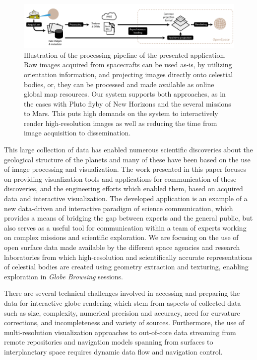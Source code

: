 \documentclass[journal]{vgtc}                %
\begin{document}
\begin{figure}
\includegraphics[width=\linewidth]{figures/overview.pdf}
\caption{Illustration of the processing pipeline of the presented application. Raw images acquired from spacecrafts can be used as-is, by utilizing orientation information, and projecting images directly onto celestial bodies, or, they can be processed and made available as online global map resources. Our system supports both approaches, as in the cases with Pluto flyby of New Horizons and the several missions to Mars. This puts high demands on the system to interactively render high-resolution images as well as reducing the time from image acquisition to dissemination.}\vspace{-2mm}
\label{fig:procpipe}
\end{figure}

This large collection of data has enabled numerous scientific discoveries about the geological structure of the planets and many of these have been based on the use of image processing and visualization.
The work presented in this paper focuses on providing visualization tools and applications for communication of these discoveries, and the engineering efforts which enabled them, based on acquired data and interactive visualization.
The developed application is an example of a new data-driven and interactive paradigm of science communication, which provides a means of bridging the gap between experts and the general public, but also serves as a useful tool for communication within a team of experts working on complex missions and scientific exploration.
We are focusing on the use of open surface data made available by the different space agencies and research laboratories from which high-resolution and scientifically accurate representations of celestial bodies are created using geometry extraction and texturing, enabling exploration in \emph{Globe Browsing} sessions.

There are several technical challenges involved in accessing and preparing the data for interactive globe rendering which stem from aspects of collected data such as size, complexity, numerical precision and accuracy, need for curvature corrections, and incompleteness and variety of sources.
Furthermore, the use of multi-resolution visualization approaches to out-of-core data streaming from remote repositories and navigation models spanning from surfaces to interplanetary space requires dynamic data flow and navigation control. 
\end{document}
